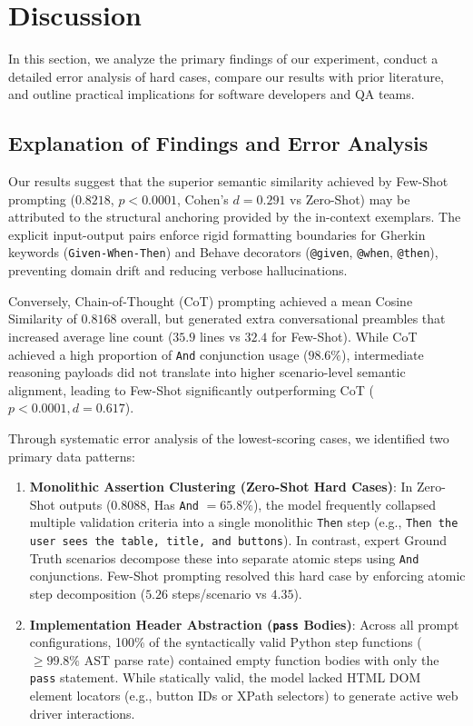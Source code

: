 \section{Discussion}
\label{sec:discussion}

In this section, we analyze the primary findings of our experiment, conduct a detailed error analysis of hard cases, compare our results with prior literature, and outline practical implications for software developers and QA teams.

\subsection{Explanation of Findings and Error Analysis}
Our results suggest that the superior semantic similarity achieved by Few-Shot prompting ($0.8218$, $p < 0.0001$, Cohen's $d = 0.291$ vs Zero-Shot) may be attributed to the structural anchoring provided by the in-context exemplars. The explicit input-output pairs enforce rigid formatting boundaries for Gherkin keywords (\texttt{Given-When-Then}) and Behave decorators (\texttt{@given}, \texttt{@when}, \texttt{@then}), preventing domain drift and reducing verbose hallucinations.

Conversely, Chain-of-Thought (CoT) prompting achieved a mean Cosine Similarity of $0.8168$ overall, but generated extra conversational preambles that increased average line count ($35.9$ lines vs $32.4$ for Few-Shot). While CoT achieved a high proportion of \texttt{And} conjunction usage ($98.6\%$), intermediate reasoning payloads did not translate into higher scenario-level semantic alignment, leading to Few-Shot significantly outperforming CoT ($p < 0.0001, d = 0.617$).

Through systematic error analysis of the lowest-scoring cases, we identified two primary data patterns:
\begin{enumerate}
    \item \textbf{Monolithic Assertion Clustering (Zero-Shot Hard Cases)}: In Zero-Shot outputs ($0.8088$, Has \texttt{And} $= 65.8\%$), the model frequently collapsed multiple validation criteria into a single monolithic \texttt{Then} step (e.g., \texttt{Then the user sees the table, title, and buttons}). In contrast, expert Ground Truth scenarios decompose these into separate atomic steps using \texttt{And} conjunctions. Few-Shot prompting resolved this hard case by enforcing atomic step decomposition ($5.26$ steps/scenario vs $4.35$).
    \item \textbf{Implementation Header Abstraction (\texttt{pass} Bodies)}: Across all prompt configurations, 100\% of the syntactically valid Python step functions ($\ge 99.8\%$ AST parse rate) contained empty function bodies with only the \texttt{pass} statement. While statically valid, the model lacked HTML DOM element locators (e.g., button IDs or XPath selectors) to generate active web driver interactions.
\end{enumerate}

